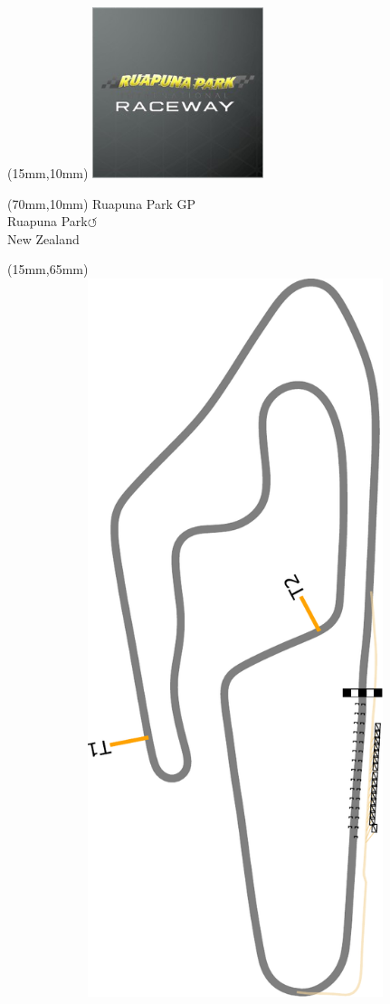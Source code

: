 \null\newpage
\begin{textblock*}{50mm}(15mm,10mm)%
\includegraphics[width=50mm]{LG/RUPU.png}
\end{textblock*}
\begin{textblock*}{130mm}(70mm,10mm)%
{\fontsize{20}{20}\selectfont Ruapuna Park GP\\}
{\fontsize{16}{16}\selectfont Ruapuna Park\hfill \huge$\circlearrowleft$\\}
{\fontsize{12}{12}\selectfont New Zealand\\}
\end{textblock*}
\begin{textblock*}{185mm}(15mm,65mm)%
\centering
\mbox{\includegraphics[width=185mm,height=210mm,keepaspectratio]{PT/RPGP.pdf}}
\end{textblock*}
